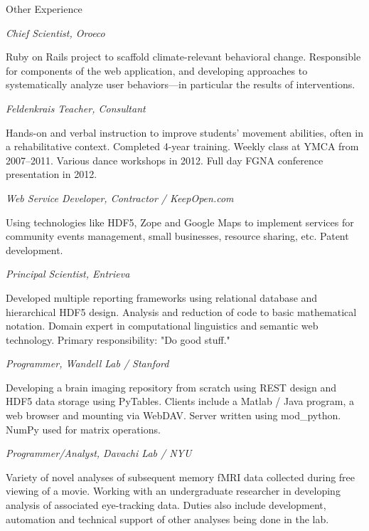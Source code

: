 \begin{rubric}{Other Experience}

\entry*[2012--present] \emph{Chief Scientist, Oroeco}
    \par Ruby on Rails project to scaffold climate-relevant behavioral change.
    Responsible for components of the web application, and developing approaches
    to systematically analyze user behaviors---in particular the results of
    interventions.

\entry*[2007--present] \emph{Feldenkrais Teacher, Consultant}
    \par  Hands-on and verbal instruction to improve students' movement
    abilities, often in a rehabilitative context.
    Completed 4-year training. Weekly class at YMCA from 2007--2011. Various
    dance workshops in 2012. Full day FGNA conference presentation in 2012.


\entry*[2004--present] \emph{Web Service Developer, Contractor / KeepOpen.com}
    \par Using technologies like HDF5, Zope and Google Maps to implement services
    for community events management, small businesses, resource sharing, etc.
    Patent development.

\entry*[2006--2007] \emph{Principal Scientist, Entrieva}
    \par Developed multiple reporting frameworks using relational database and
    hierarchical HDF5 design.  Analysis and reduction of code to basic
    mathematical notation.  Domain expert in computational linguistics and
    semantic web technology.  Primary responsibility: "Do good stuff."

\entry*[2006] \emph{Programmer, Wandell Lab / Stanford}
    \par Developing a brain imaging repository from scratch using REST design
    and HDF5 data storage using PyTables.  Clients include a Matlab /
    Java program, a web browser and mounting via WebDAV.  Server
    written using mod_python.  NumPy used for matrix operations.

\entry*[2005--2006] \emph{Programmer/Analyst, Davachi Lab / NYU}
    \par Variety of novel analyses of subsequent memory fMRI data collected
    during free viewing of a movie.  Working with an undergraduate researcher in
    developing analysis of associated eye-tracking data.  Duties also include
    development, automation and technical support of other analyses being done
    in the lab.


\end{rubric}

